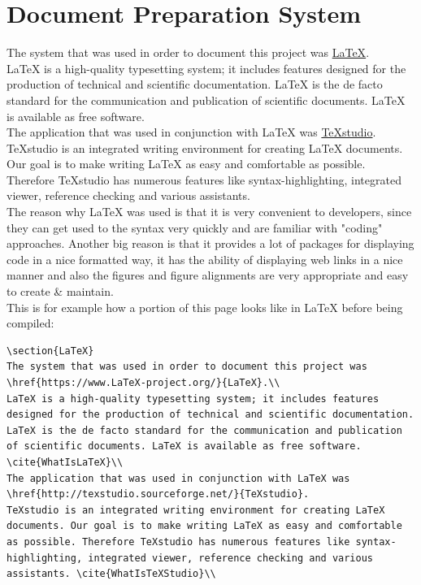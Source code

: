 \section{Document Preparation System}
The system that was used in order to document this project was \href{https://www.LaTeX-project.org/}{LaTeX}.\\
LaTeX is a high-quality typesetting system; it includes features designed for the production of technical and scientific documentation. LaTeX is the de facto standard for the communication and publication of scientific documents. LaTeX is available as free software. \cite{WhatIsLaTeX}\\
The application that was used in conjunction with LaTeX was \href{http://texstudio.sourceforge.net/}{TeXstudio}.
TeXstudio is an integrated writing environment for creating LaTeX documents. Our goal is to make writing LaTeX as easy and comfortable as possible. Therefore TeXstudio has numerous features like syntax-highlighting, integrated viewer, reference checking and various assistants. \cite{WhatIsTeXStudio}\\
The reason why LaTeX was used is that it is very convenient to developers, since they can get used to the syntax very quickly and are familiar with "coding" approaches. Another big reason is that it provides a lot of packages for displaying code in a nice formatted way, it has the ability of displaying web links in a nice manner and also the figures and figure alignments are very appropriate and easy to create \& maintain.\\
\newline
This is for example how a portion of this page looks like in LaTeX before being compiled:
\begin{verbatim}
\section{LaTeX}
The system that was used in order to document this project was \href{https://www.LaTeX-project.org/}{LaTeX}.\\
LaTeX is a high-quality typesetting system; it includes features designed for the production of technical and scientific documentation. LaTeX is the de facto standard for the communication and publication of scientific documents. LaTeX is available as free software. \cite{WhatIsLaTeX}\\
The application that was used in conjunction with LaTeX was \href{http://texstudio.sourceforge.net/}{TeXstudio}.
TeXstudio is an integrated writing environment for creating LaTeX documents. Our goal is to make writing LaTeX as easy and comfortable as possible. Therefore TeXstudio has numerous features like syntax-highlighting, integrated viewer, reference checking and various assistants. \cite{WhatIsTeXStudio}\\
\end{verbatim}
